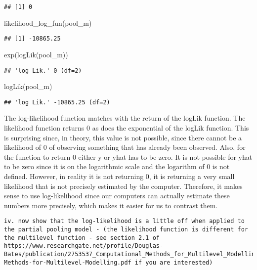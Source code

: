 \documentclass[
]{article}
\newenvironment{Shaded}{\begin{snugshade}}{\end{snugshade}}
\newcommand{\FunctionTok}[1]{\textcolor[rgb]{0.00,0.00,0.00}{#1}}
\newcommand{\NormalTok}[1]{#1}
\begin{document}
\begin{verbatim}
## [1] 0
\end{verbatim}

\begin{Shaded}
\begin{Highlighting}[]
\FunctionTok{likelihood\_log\_fun}\NormalTok{(pool\_m)}
\end{Highlighting}
\end{Shaded}

\begin{verbatim}
## [1] -10865.25
\end{verbatim}

\begin{Shaded}
\begin{Highlighting}[]
\FunctionTok{exp}\NormalTok{(}\FunctionTok{logLik}\NormalTok{(pool\_m))}
\end{Highlighting}
\end{Shaded}

\begin{verbatim}
## 'log Lik.' 0 (df=2)
\end{verbatim}

\begin{Shaded}
\begin{Highlighting}[]
\FunctionTok{logLik}\NormalTok{(pool\_m)}
\end{Highlighting}
\end{Shaded}

\begin{verbatim}
## 'log Lik.' -10865.25 (df=2)
\end{verbatim}

The log-likelihood function matches with the return of the logLik
function. The likelihood function returns 0 as does the exponential of
the logLik function. This is surprising since, in theory, this value is
not possible, since there cannot be a likelihood of 0 of observing
something that has already been observed. Also, for the function to
return 0 either y or yhat has to be zero. It is not possible for yhat to
be zero since it is on the logarithmic scale and the logarithm of 0 is
not defined. However, in reality it is not returning 0, it is returning
a very small likelihood that is not precisely estimated by the computer.
Therefore, it makes sense to use log-likelihood since our computers can
actually estimate these numbers more precisely, which makes it easier
for us to contrast them.

\begin{verbatim}
iv. now show that the log-likelihood is a little off when applied to the partial pooling model - (the likelihood function is different for the multilevel function - see section 2.1 of https://www.researchgate.net/profile/Douglas-Bates/publication/2753537_Computational_Methods_for_Multilevel_Modelling/links/00b4953b4108d73427000000/Computational-Methods-for-Multilevel-Modelling.pdf if you are interested)  
\end{verbatim}
\end{document}
